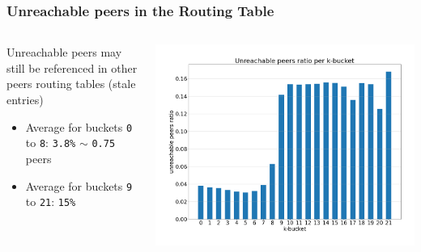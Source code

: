 \documentclass{pl-slide}
\begin{document}
\begin{frame}
\frametitle{Unreachable peers in the Routing Table}

\begin{columns}[onlytextwidth]
\begin{column}{0.38\textwidth}
Unreachable peers may still be referenced in other peers routing tables (stale entries)
\bigskip
   \begin{itemize}
   		\item Average for buckets \texttt{0} to \texttt{8}: \texttt{3.8\%} $\sim$ \texttt{0.75} peers
   		\item Average for buckets \texttt{9} to \texttt{21}: \texttt{15\%}
   \end{itemize}
\end{column}
\begin{column}{0.58\textwidth}
    \begin{center}
		\includegraphics[width=\textwidth]{plots/unreachable-peers.png}
    \end{center}
\end{column}
\end{columns}
\end{frame}
\end{document}
